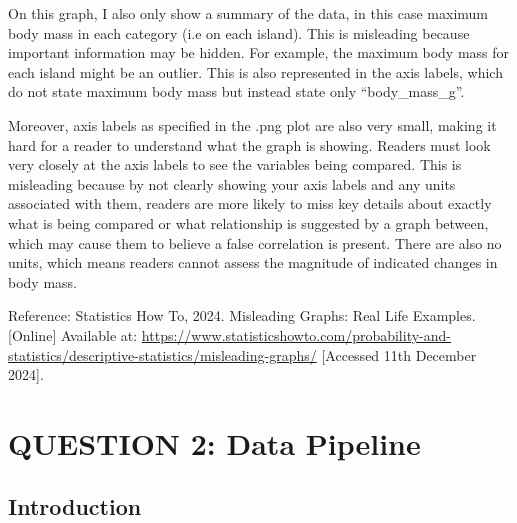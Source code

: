 \documentclass[
]{article}
\begin{document}
On this graph, I also only show a summary of the data, in this case
maximum body mass in each category (i.e on each island). This is
misleading because important information may be hidden. For example, the
maximum body mass for each island might be an outlier. This is also
represented in the axis labels, which do not state maximum body mass but
instead state only ``body\_mass\_g''.

Moreover, axis labels as specified in the .png plot are also very small,
making it hard for a reader to understand what the graph is showing.
Readers must look very closely at the axis labels to see the variables
being compared. This is misleading because by not clearly showing your
axis labels and any units associated with them, readers are more likely
to miss key details about exactly what is being compared or what
relationship is suggested by a graph between, which may cause them to
believe a false correlation is present. There are also no units, which
means readers cannot assess the magnitude of indicated changes in body
mass.

Reference: Statistics How To, 2024. Misleading Graphs: Real Life
Examples. {[}Online{]} Available at:
\url{https://www.statisticshowto.com/probability-and-statistics/descriptive-statistics/misleading-graphs/}
{[}Accessed 11th December 2024{]}.

\section{QUESTION 2: Data Pipeline}\label{question-2-data-pipeline}

\subsection{Introduction}\label{introduction}
\end{document}

